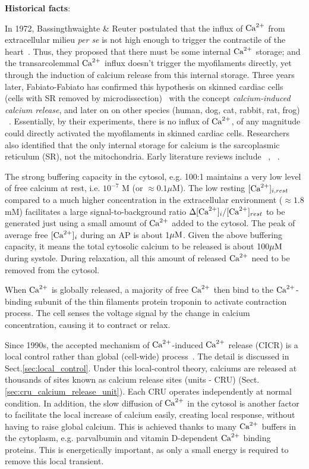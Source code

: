 \begin{framed}
  {\bf Historical facts}: 

  In 1972, Bassingthwaighte \& Reuter postulated that the influx of ${\text{Ca}^{2+}}$ from
  extracellular milieu {\it per se} is not high enough to trigger the
  contractile of the heart~\citep{bassingthwaighte1972cme}. Thus, they proposed
  that there must be some internal ${\text{Ca}^{2+}}$ storage; and the transarcolemmal ${\text{Ca}^{2+}}$
  influx doesn't trigger the myofilaments directly, yet through the induction of
  calcium release from this internal storage. Three years later, Fabiato-Fabiato
  has confirmed this hypothesis on skinned cardiac cells (cells with SR removed
  by microdissection)~\citep{fabiato1975cic} with the concept {\it
  calcium-induced calcium release}, and later on on other species (human, dog,
  cat, rabbit, rat, frog) ~\citep{fabiato1979cir}. Essentially, by their
  experiments, there is no influx of ${\text{Ca}^{2+}}$, of any magnitude could directly
  activated the myofilaments in skinned cardiac cells. Researchers also
  identified that the only internal storage for calcium is the sarcoplasmic
  reticulum (SR), not the mitochondria. Early literature reviews include
  ~\citep{ikemoto1977crs}, ~\citep{fabiato1983cir}.

\end{framed}

The strong buffering capacity in the cytosol, e.g. 100:1 \citep{bers1991ecc}
maintains a very low level of free calcium at rest, i.e. $10^{-7}$ M (or
$\approx 0.1\mu$M). The low resting $[{\text{Ca}^{2+}}]_{i,rest}$ compared to a much higher
concentration in the extracellular environment ($\approx 1.8$mM) facilitates a
large signal-to-background ratio $\Delta [{\text{Ca}^{2+}}]_i/[{\text{Ca}^{2+}}]_{rest}$ to be generated
just using a small amount of ${\text{Ca}^{2+}}$ added to the cytosol. The peak of average
free $[{\text{Ca}^{2+}}]_i$ during an AP is about 1${\mu\text{M}}$. Given the above buffering
capacity, it means the total cytosolic calcium to be released is about
100${\mu\text{M}}$ during systole. During relaxation, all this amount of released ${\text{Ca}^{2+}}$
need to be removed from the cytosol.

When ${\text{Ca}^{2+}}$ is globally released, a majority of free ${\text{Ca}^{2+}}$ then bind to the
${\text{Ca}^{2+}}$-binding subunit of the thin filaments protein troponin to activate
contraction process. The cell senses the voltage signal by the change in calcium
concentration, causing it to contract or relax. 

Since 1990s, the accepted mechanism of ${\text{Ca}^{2+}}$-induced ${\text{Ca}^{2+}}$ release (CICR) is a
local control rather than global (cell-wide) process~\citep{Cannell2011}. The
detail is discussed in Sect.\ref{sec:local_control}. Under this local-control
theory, calciums are released at thousands of sites known as calcium release
sites (units - CRU) (Sect.\ref{sec:cru_calcium_release_unit}). Each CRU operates
independently at normal condition. In addition, the slow diffusion of ${\text{Ca}^{2+}}$ in
the cytosol is another factor to facilitate the local increase of calcium
easily, creating local response, without having to raise global calcium.
This is achieved thanks to many ${\text{Ca}^{2+}}$ buffers in the cytoplasm, e.g. parvalbumin
and vitamin D-dependent ${\text{Ca}^{2+}}$ binding proteins. This is energetically important,
as only a small energy is required to remove this local  transient.
 
